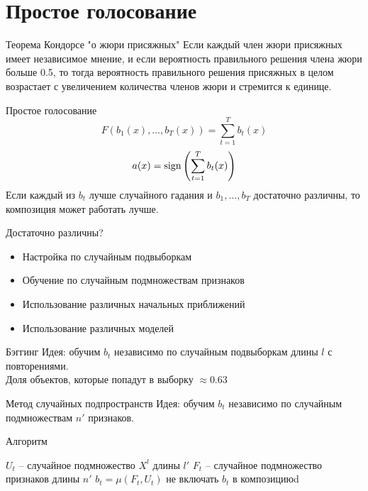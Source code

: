 \documentclass[10pt]{beamer}
\begin{document}
\section{Простое голосование}

\begin{frame}{Теорема Кондорсе "о жюри присяжных"}
  Если каждый член жюри присяжных имеет независимое мнение, и если вероятность правильного решения члена жюри больше 0.5, то тогда вероятность правильного решения присяжных в целом возрастает с увеличением количества членов жюри и стремится к единице.   
\end{frame}


\begin{frame}{Простое голосование}
  $$F(b_1(x), \dots, b_T(x)) = \sum\limits_{t=1}^{T} b_t(x)$$
  \bigbreak
  \pause
  $$a(x) = \operatorname{sign} \left( \sum\limits_{t=1}^{T} b_t(x) \right)$$
  \bigbreak
  \pause
  Если каждый из $b_t$ лучше случайного гадания и $b_1, \dots, b_T$ достаточно различны, то композиция может работать лучше.
\end{frame}

\begin{frame}{Достаточно различны?}
  \begin{itemize}
    \item Настройка по случайным подвыборкам
    \item Обучение по случайным подмножествам признаков
    \item Использование различных начальных приближений 
    \item Использование различных моделей
  \end{itemize}
\end{frame}

{
\begin{frame}{Бэггинг}
    \alert{Идея}: обучим $b_t$ независимо по случайным подвыборкам длины $l$ с повторениями.\\
    Доля объектов, которые попадут в выборку $\approx 0.63$
\end{frame}
}

{
\begin{frame}{Метод случайных подпространств}
    \alert{Идея}: обучим $b_t$ независимо по случайным подмножествам $n'$ признаков.\\
\end{frame}
}

\begin{frame}{Алгоритм}
  	\begin{algorithmic}[1]
        \State $U_t$ -- случайное подмножество $X^l$ длины $l'$
        \State $F_t$ -- случайное подмножество признаков длины $n'$
        \State $b_t = \mu (F_t, U_t)$
          \State не включать $b_t$ в композициюd
        \EndIf
      \EndFor
    \EndFunction
  \end{algorithmic}
\end{frame}
\end{document}
